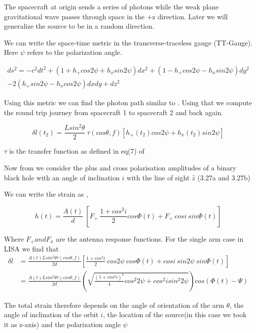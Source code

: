 \documentclass[10pt,a4paper]{article}
\begin{document}
The spacecraft at origin sends a series of photons while the weak plane gravitational wave passes through space in the +z direction. Later we will generalize the source to be in a random direction.

We can write the space-time metric in the transverse-traceless gauge (TT-Gauge). Here $\psi$ refers to the polarization angle.

 


\begin{multline}
ds^2 = - c^2 dt^2 + (1+ h_+ cos 2\psi + h_x sin 2 \psi) d x^2 +(1- h_+ cos 2\psi - h_x sin 2 \psi) d y^2 \\
 - 2(h_+ sin 2 \psi - h_x cos 2 \psi) dx dy + dz^2
\end{multline}

Using this metric we can  find the photon path similar to \cite{cornish}. Using that we compute the round trip journey from spacecraft 1 to spacecraft 2 and back again. 

\begin{equation}
\delta l(t_2) = \frac{L sin^2 \theta}{2} \ \tau(cos \theta,f) \left[ h_{+}(t_2) cos 2\psi + h_{x}(t_2) sin 2\psi \right]
\end{equation}

$\tau$ is the transfer function as defined in eq(7) of \cite{cornish}

Now from we consider the plus and cross polarisation amplitudes of a binary black hole with an angle of inclination $i$ with the line of sight $\hat{z}$ (3.27a and 3.27b) \cite{whelan}

We can write the strain as \cite{whelan}
,

\begin{equation}
h(t) = \frac{A(t)}{d}\ \left[ F_{+} \ \frac{1+ cos^2 i}{2} cos\Phi(t) + F_{\times} \ cosi \ sin\Phi(t) \right]
\end{equation}

Where $F_{+} and F_{x}$ are the antenna response functions. For the single arm case in LISA we find that
\begin{align}
\delta l&=\frac{A(t) L sin^2 \theta \tau(cos \theta,f)}{2d} \left[\frac{1+cos^2 i}{2} \ cos 2\psi \ cos \Phi(t) + cos i \ sin 2\psi \ sin \Phi(t)\right]\\
&=\frac{A(t) L sin^2 \theta \tau(cos \theta,f)}{2d} \left( \sqrt{ \frac{(1+cos^2 i)^2}{4} cos^2 2\psi  + cos^2 i sin^2 2\psi} \right)cos(\Phi(t)-\Psi)
\end{align}

The total strain therefore depends on the angle of orientation of the arm $\theta$, the angle of inclination of the orbit $i$, the location of the source(in this case we took it as z-axis) and the polarization angle $\psi$
\end{document}
